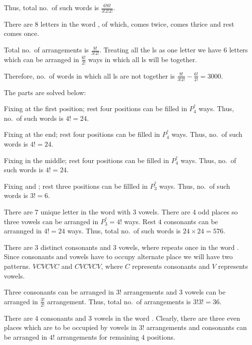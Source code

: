   Thus, total no.\ of such words is $\frac{6!6!}{3!2!2!}$.
\item There are $8$ letters in the word , of which,  comes twice, 
  comes thrice and rest comes once.

  Total no.\ of arrangements is $\frac{8!}{3!2!}$. Treating all the ls as one letter we have $6$ letters
  which can be arranged in $\frac{6!}{2!}$ ways in which all ls will be together.

  Therefore, no.\ of words in which all ls are not together is $\frac{8!}{3!2!} - \frac{6!}{2!} = 3000$.
\item The parts are solved below:
  \startitemize[i]
  \item Fixing  at the first position; rest four positions can be filled in $P_4^^4$ ways. Thus,
    no.\ of such words is $4! = 24$.
  \item Fixing  at the end; rest four positions can be filled in $P_4^^4$ ways. Thus,
    no.\ of such words is $4! = 24$.
  \item Fixing  in the middle; rest four positions can be filled in $P_4^^4$ ways. Thus,
    no.\ of such words is $4! = 24$.
  \item Fixing  and ; rest three positions can be fillled in $P_3^^3$ ways. Thus, no.\ of
    such words is $3! = 6$.
  \stopitemize
\item There are $7$ unique letter in the word  with $3$ vowels. There are $4$ odd places
  so three vowels can be arranged in $P_3^^4 = 4!$ ways. Rest $4$ consonants can be arrannged in $4! = 24$
  ways. Thus, total no.\ of such words is $24\times 24 = 576$.
\item There are $3$ distinct consonants and $3$ vowels, where  repeats once in the word
  . Since consonants and vowels have to occupy alternate place we will have two
  patterns. $VCVCVC$ and $CVCVCV$, where $C$ represents consonants and $V$ represents vowels.

  Three consonants can be arranged in $3!$ arrangements and $3$ vowels can be arranged in $\frac{3!}{2!}$
  arrangement. Thus, total no.\ of arrangements is $3!3! = 36$.
\item There are $4$ consonants and $3$ vowels in the word . Clearly, there are three even
  places which are to be occupied by vowels in $3!$ arrangements and consonants can be arranged in $4!$
  arrangements for remaining $4$ positions.

